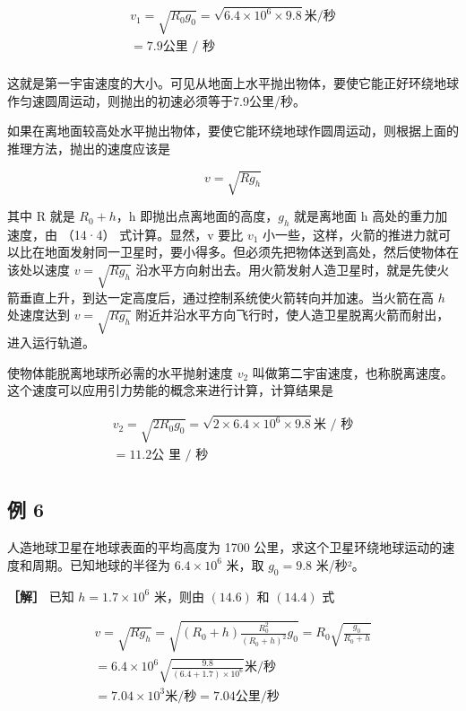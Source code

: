 \[
\begin{array}{l} v _ {1} = \sqrt {R _ {0} g _ {0}} = \sqrt {6.4 \times 10 ^ {6} \times 9.8} \text{米/秒} \\ = 7.9 \text{公里 / 秒} \tag {14.5} \\ \end{array}
\]

这就是第一宇宙速度的大小。可见从地面上水平抛出物体，要使它能正好环绕地球作匀速圆周运动，则抛出的初速必须等于7.9公里/秒。

如果在离地面较高处水平抛出物体，要使它能环绕地球作圆周运动，则根据上面的推理方法，抛出的速度应该是

\[
v = \sqrt {R g _ {h}} \tag {14.6}
\]

其中 R 就是 \(R_{0} + h\)，h 即抛出点离地面的高度，\(g_{h}\) 就是离地面
h 高处的重力加速度，由 （14·4） 式计算。显然，v 要比 \(v_{1}\)
小一些，这样，火箭的推进力就可以比在地面发射同一卫星时，要小得多。但必须先把物体送到高处，然后使物体在该处以速度
\(v = \sqrt{Rg_h}\)
沿水平方向射出去。用火箭发射人造卫星时，就是先使火箭垂直上升，到达一定高度后，通过控制系统使火箭转向并加速。当火箭在高
\(h\) 处速度达到 \(v = \sqrt{Rg_h}\)
附近并沿水平方向飞行时，使人造卫星脱离火箭而射出，进入运行轨道。

使物体能脱离地球所必需的水平抛射速度 \(v_{2}\)
叫做第二宇宙速度，也称脱离速度。这个速度可以应用引力势能的概念来进行计算，计算结果是

\[
\begin{array}{l} v _ {2} = \sqrt {2 R _ {0} g _ {0}} = \sqrt {2 \times 6.4 \times 10 ^ {6} \times 9.8} \text{米 / 秒} \\ = 11.2 \text{公 里 / 秒} \\ \end{array}
\]

\subsection{例 6}\label{ux4f8b-6-9}

人造地球卫星在地球表面的平均高度为 1700
公里，求这个卫星环绕地球运动的速度和周期。已知地球的半径为
\(6.4 \times 10^{6}\) 米，取 \(g_{0} = 9.8\) 米/秒²。

\textbf{［解］} 已知 \(h = 1.7 \times 10^{6}\) 米，则由 \((14.6)\) 和
\((14.4)\) 式

\[
\begin{array}{l} v=\sqrt{Rg_h} =\sqrt{(R_0+h)\frac{R_0^2}{(R_0+h)^2}g_0} =R_0\sqrt{\frac{g_0}{R_0+h}}\\ =6.4\times10^6\sqrt{\frac{9.8}{(6.4+1.7)\times10^6}}\text{米/秒}\\ =7.04\times10^3\text{米/秒}=7.04\text{公里/秒} \end{array}
\]


